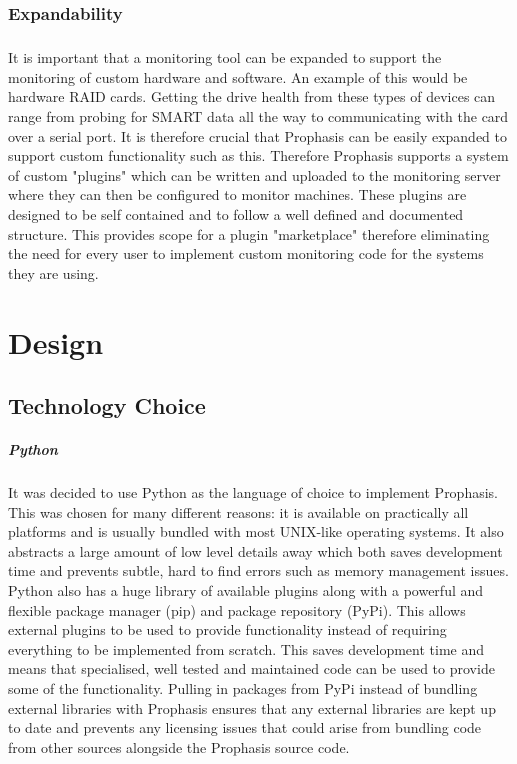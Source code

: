 \documentclass[bsc,logo,twoside,singlespacing]{infthesis}
\begin{document}
\subsection{Expandability}
\paragraph*{}
	It is important that a monitoring tool can be expanded to support the
	monitoring of custom hardware and software.  An example of this would be
	hardware RAID cards.  Getting the drive health from these types of devices can
	range from probing for SMART data all the way to communicating with the card
	over a serial port.  It is therefore crucial that Prophasis can be easily
	expanded to support custom functionality such as this. Therefore Prophasis
	supports a system of custom "plugins" which can be written and uploaded to the
	monitoring server where they can then be configured to monitor machines. These
	plugins are designed to be self contained and to follow a well defined and
	documented structure.  This provides scope for a plugin "marketplace" therefore
	eliminating the need for every user to implement custom monitoring code for the
	systems they are using.


\chapter{Design}
\section{Technology Choice}
\paragraph*{Python}
	It was decided to use Python as the language of choice to implement Prophasis.
	This was chosen for many different reasons: it is available on practically all
	platforms and is usually bundled with most UNIX-like operating systems.  It
	also abstracts a large amount of low level details away which both saves
	development time and prevents subtle, hard to find errors such as memory
	management issues.  Python also has a huge library of available plugins along
	with a powerful and flexible package manager (pip) and package repository
	(PyPi).  This allows external plugins to be used to provide functionality
	instead of requiring everything to be implemented from scratch.  This saves
	development time and means that specialised, well tested and maintained code
	can be used to provide some of the functionality.  Pulling in packages from
	PyPi instead of bundling external libraries with Prophasis ensures that any
	external libraries are kept up to date and prevents any licensing issues that
	could arise from bundling code from other sources alongside the Prophasis
	source code.
	
\end{document}
